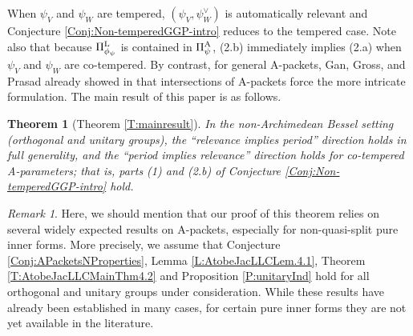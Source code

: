 \documentclass[11pt,letterpaper]{amsart}
\theoremstyle{plain}
\newcounter{theorem}[section]
\numberwithin{theorem}{section}
\numberwithin{equation}{subsection}
\newtheorem{Thm}[theorem]{Theorem}
\theoremstyle{remark}
\newtheorem{Rmk}[theorem]{Remark}
\def\LP{\Pi^{\rm L}} %
\def\AP{\Pi^{\rm A}} %
\begin{document}
When $\psi_V$ and $\psi_W$ are tempered, $\left(\psi_V, \psi_W^\vee\right)$ is automatically relevant and Conjecture \ref{Conj:Non-temperedGGP-intro} reduces to the tempered case. Note also that because $\LP_{\phi_\psi}$ is contained in $\AP_\psi$, (2.b) immediately implies (2.a) when $\psi_V$ and $\psi_W$ are co-tempered. By contrast, for general A-packets, Gan, Gross, and Prasad already showed in \cite[Sect. 7]{MR4190046} that intersections of A-packets force the more intricate formulation. The main result of this paper is as follows.

\begin{Thm}[Theorem \ref{T:mainresult}]\label{Thm:main-intro}
In the non-Archimedean Bessel setting (orthogonal and unitary groups), the ``relevance implies period'' direction holds in full generality, and the ``period implies relevance'' direction holds for co-tempered A-parameters; that is, parts (1) and (2.b) of Conjecture \ref{Conj:Non-temperedGGP-intro} hold.
\end{Thm}

\vskip 5pt

\begin{Rmk}
Here, we should mention that our proof of this theorem relies on several widely expected results on A-packets, especially for non-quasi-split pure inner forms. More precisely, we assume that Conjecture \ref{Conj:APacketsNProperties}, Lemma \ref{L:AtobeJacLLCLem.4.1}, Theorem \ref{T:AtobeJacLLCMainThm4.2} and Proposition \ref{P:unitaryInd} hold for all orthogonal and unitary groups under consideration. While these results have already been established in many cases, for certain pure inner forms they are not yet available in the literature.   
\end{Rmk}

\vskip 5pt
\end{document}
